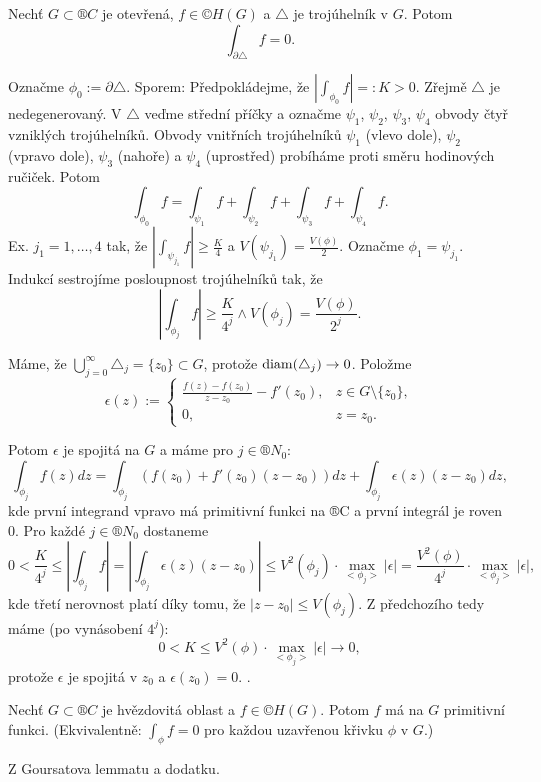 \documentclass[12pt]{article}					%
\begin{document}
\begin{veta}
	Nechť $G \subset ®C$ je otevřená, $f \in ©H(G)$ a $\triangle$ je trojúhelník v $G$. Potom
	$$ \int_{\partial \triangle} f = 0. $$

	\begin{dukazin}
		Označme $\phi_0 := \partial \triangle$. Sporem: Předpokládejme, že $|\int_{\phi_0} f| =: K > 0$. Zřejmě $\triangle$ je nedegenerovaný. V $\triangle$ veďme střední příčky a označme $\psi_1$, $\psi_2$, $\psi_3$, $\psi_4$ obvody čtyř vzniklých trojúhelníků. Obvody vnitřních trojúhelníků $\psi_1$ (vlevo dole), $\psi_2$ (vpravo dole), $\psi_3$ (nahoře) a $\psi_4$ (uprostřed) probíháme proti směru hodinových ručiček. Potom
		$$ \int_{\phi_0} f = \int_{\psi_1} f + \int_{\psi_2} f + \int_{\psi_3} f + \int_{\psi_4} f. $$
		Ex. $j_1 = 1, …, 4$ tak, že $|\int_{\psi_{j_1}} f| ≥ \frac{K}{4}$ a $V(\psi_{j_1}) = \frac{V(\phi)}{2}$. Označme $\phi_1 = \psi_{j_1}$. Indukcí sestrojíme posloupnost trojúhelníků tak, že
		$$ |\int_{\phi_j} f| ≥ \frac{K}{4^j} \land V(\phi_j) = \frac{V(\phi)}{2^j}. $$

		Máme, že $\bigcup_{j=0}^∞ \triangle_j = \{z_0\} \subset G$, protože $\operatorname{diam}(\triangle_j) \rightarrow 0$. Položme
		$$ \epsilon(z) := \begin{cases}\frac{f(z) - f(z_0)}{z - z_0} - f'(z_0), & z \in G\setminus \{z_0\},\\ 0, & z = z_0.\end{cases} $$

		Potom $\epsilon$ je spojitá na $G$ a máme pro $j \in ®N_0$:
		$$ \int_{\phi_j} f(z) dz = \int_{\phi_j} (f(z_0) + f'(z_0)(z - z_0))dz + \int_{\phi_j}\epsilon(z)(z - z_0) dz, $$
		kde první integrand vpravo má primitivní funkci na ®C a první integrál je roven 0. Pro každé $j \in ®N_0$ dostaneme
		$$ 0 < \frac{K}{4^j} ≤ |\int_{\phi_j} f| = |\int_{\phi_j} \epsilon(z)(z - z_0)| ≤ V^2(\phi_j)·\max_{<\phi_j>} |\epsilon| = \frac{V^2(\phi)}{4^j}·\max_{<\phi_j>}|\epsilon|, $$
		kde třetí nerovnost platí díky tomu, že $|z - z_0| ≤ V(\phi_j)$. Z předchozího tedy máme (po vynásobení $4^j$):
		$$ 0 < K ≤ V^2(\phi)·\max_{<\phi_j>}|\epsilon| \rightarrow 0, $$
		protože $\epsilon$ je spojitá v $z_0$ a $\epsilon(z_0) = 0$. \lightning.
	\end{dukazin}
\end{veta}

\begin{veta}
	Nechť $G \subset ®C$ je hvězdovitá oblast a $f \in ©H(G)$. Potom $f$ má na $G$ primitivní funkci. (Ekvivalentně: $\int_{\phi} f = 0$ pro každou uzavřenou křivku $\phi$ v $G$.)

	\begin{dukazin}
		Z Goursatova lemmatu a dodatku.
	\end{dukazin}
\end{veta}
\end{document}
